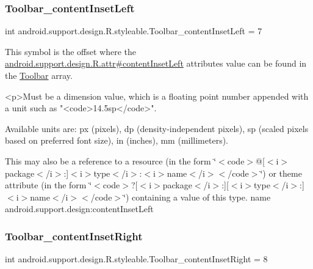 \subsubsection{\texorpdfstring{Toolbar\+\_\+content\+Inset\+Left}{Toolbar\_contentInsetLeft}}
{\footnotesize\ttfamily int android.\+support.\+design.\+R.\+styleable.\+Toolbar\+\_\+content\+Inset\+Left = 7\hspace{0.3cm}{\ttfamily [static]}}

This symbol is the offset where the \hyperlink{classandroid_1_1support_1_1design_1_1R_1_1attr_a158a78f4136ee86acfbc3de6d947ee1c}{android.\+support.\+design.\+R.\+attr\#content\+Inset\+Left} attribute\textquotesingle{}s value can be found in the \hyperlink{classandroid_1_1support_1_1design_1_1R_1_1styleable_a7783ebe780dbe2a845802a40519a46e9}{Toolbar} array.

\begin{DoxyVerb}      <p>Must be a dimension value, which is a floating point number appended with a unit such as "<code>14.5sp</code>".
\end{DoxyVerb}
 Available units are\+: px (pixels), dp (density-\/independent pixels), sp (scaled pixels based on preferred font size), in (inches), mm (millimeters). 

This may also be a reference to a resource (in the form \char`\"{}$<$code$>$@\mbox{[}$<$i$>$package$<$/i$>$\+:\mbox{]}$<$i$>$type$<$/i$>$\+:$<$i$>$name$<$/i$>$$<$/code$>$\char`\"{}) or theme attribute (in the form \char`\"{}$<$code$>$?\mbox{[}$<$i$>$package$<$/i$>$\+:\mbox{]}\mbox{[}$<$i$>$type$<$/i$>$\+:\mbox{]}$<$i$>$name$<$/i$>$$<$/code$>$\char`\"{}) containing a value of this type.  name android.\+support.\+design\+:content\+Inset\+Left \mbox{\label{classandroid_1_1support_1_1design_1_1R_1_1styleable_afa26b6ecdf630ac0c5f79af2ca0a1f2a}} 
\subsubsection{\texorpdfstring{Toolbar\+\_\+content\+Inset\+Right}{Toolbar\_contentInsetRight}}
{\footnotesize\ttfamily int android.\+support.\+design.\+R.\+styleable.\+Toolbar\+\_\+content\+Inset\+Right = 8\hspace{0.3cm}{\ttfamily [static]}}

